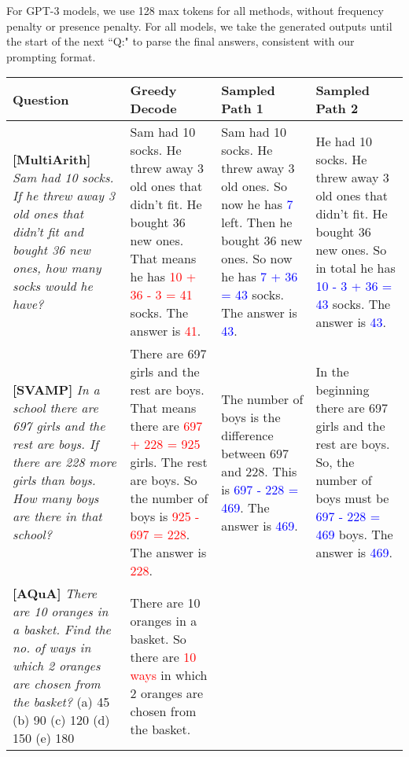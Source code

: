 For GPT-3 models, we use 128 max tokens for all methods, without frequency penalty or presence penalty. For all models, we take the generated outputs until the start of the next ``Q:" to parse the final answers, consistent with our prompting format.









\begin{table}[h]
\scriptsize
    \centering
    \begin{tabular}{p{3.2cm} | p{3.1cm} | p{2.6cm} | p{3.3cm} }
        Question & Greedy Decode & Sampled Path 1 & Sampled Path 2  \\
        \midrule
        \textbf{[MultiArith]}  \textit{Sam had 10 socks. If he threw away 3 old ones that didn't fit and bought 36 new ones, how many socks would he have?}
         & Sam had 10 socks. He threw away 3 old ones that didn't fit. He bought 36 new ones. That means he has \textcolor{red}{10 + 36 - 3 = 41} socks. The answer is \textcolor{red}{41}.
         & Sam had 10 socks. He threw away 3 old ones. So now he has \textcolor{blue}{7} left. Then he bought 36 new ones. So now he has \textcolor{blue}{7 + 36 = 43} socks. The answer is \textcolor{blue}{43}.  
         & He had 10 socks. He threw away 3 old ones that didn't fit. He bought 36 new ones. So in total he has \textcolor{blue}{10 - 3 + 36 = 43} socks. The answer is \textcolor{blue}{43}.  \\
         \midrule
        \textbf{[SVAMP]}   \textit{In a school there are 697 girls and the rest are boys. If there are 228 more girls than boys. How many boys are there in that school?}
         & There are 697 girls and the rest are boys. That means there are \textcolor{red}{697 + 228 = 925} girls. The rest are boys. So the number of boys is \textcolor{red}{925 - 697 = 228}. The answer is \textcolor{red}{228}. 
         & The number of boys is the difference between 697 and 228. This is \textcolor{blue}{697 - 228 = 469}. The answer is \textcolor{blue}{469}.  
         & In the beginning there are 697 girls and the rest are boys. So, the number of boys must be \textcolor{blue}{697 - 228 = 469} boys. The answer is \textcolor{blue}{469}.  \\
         \midrule
         \textbf{[AQuA]} \textit{There are 10 oranges in a basket. Find the no. of ways in which 2 oranges are chosen from the basket?} (a) 45 (b) 90 (c) 120 (d) 150 (e) 180
         & There are 10 oranges in a basket. So there are \textcolor{red}{10 ways} in which 2 oranges are chosen from the basket.  

\end{tabular}
\end{table}
